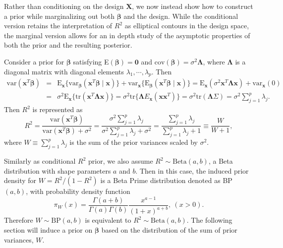 \documentclass[12pt]{article}
\newcommand{\X}{{\bm  X}}
\newcommand{\Lambdabf}{{\mathbf \Lambda}}
\begin{document}
Rather than conditioning on the design $\X$, we now instead show how to construct a prior while marginalizing out both $\bm{\beta}$ and the design. While the conditional version retains the interpretation of $R^2$ as elliptical contours in the design space, the marginal version allows for an in depth study of the asymptotic properties of   both the prior and the resulting posterior.

Consider a prior for   $ \bm{\beta}$  satisfying  E$(\bm{\beta}) = \bm 0$ and $\text{cov}(\bm{\beta}) =  \sigma^2\Lambdabf$, where $\Lambdabf$ is a diagonal matrix with diagonal elements  $ \lambda_1, \cdots, \lambda_p$.
Then
\begin{eqnarray*}
	\text{var}( \bm{x}^T\bm{\beta}) &=& \text{E}_{\bm{x}}\{ \text{var}_{\bm{\beta}}( \bm{x}^T\bm{\beta} \mid  \bm{x})\} + \text{var}_{\bm{x}}\{ \text{E}_{\bm{\beta}}( \bm{x}^T\bm{\beta}\mid \bm{x})\}
	= \text{E}_ {\bm{x}} (  \sigma^2  {\bm{x}}^T  \Lambdabf  {\bm{x}} ) + \text{var}_ {\bm{x}}( 0)\\
	&=& \sigma^2  \text{E}_ {\bm{x}}\{ \text{tr} ( {\bm{x}}^T  \Lambdabf   {\bm{x}}  )\}
	= \sigma^2 \text{tr}\{  \Lambdabf E_{\bm{x}} (     {\bm{x}}  {\bm{x}}^T ) \}
	= \sigma^2 \text{tr} (  \Lambdabf  \Sigma )
	= \sigma^2 \sum_{j=1}^p \lambda_j.
\end{eqnarray*}
Then  $R^2$ is represented as
\begin{equation} \label{eq_rsquare linear regression model}
R^2  = \frac{\text{var}({{\bm{x}}}^T\bm{\beta})}{\text{var}({ {\bm{x}}}^T\bm{\beta}) + \sigma^2}  =  \frac{\sigma^2 \sum\limits_{j=1}^p \lambda_j}{\sigma^2 \sum\limits_{j=1}^p \lambda_j  + \sigma^2}
= \frac{  \sum\limits_{j=1}^p \lambda_j}{  \sum\limits_{j=1}^p \lambda_j  + 1}  \equiv \frac{W}{W+1},
\end{equation}
where $W \equiv \sum_{j=1}^p \lambda_j $ is the sum of the prior variances scaled by $\sigma^2$.


Similarly as conditional $R^2$ prior, we   also assume  $R^2\sim \text{Beta}(a,b)$,  a Beta distribution with shape parameters $a$ and $b$. Then in this case,
the induced prior density   for  $ W =  {R^2}/(1-R^2)$  is a Beta Prime distribution \citep{johnson1995continuous} denoted as BP$(a,b)$,  with probability density function
\begin{equation*}\label{eq_varienceterm's pdf}
\pi_W(x)=  \frac{\Gamma(a+b)}{\Gamma(a)\Gamma(b)}\frac{x^{a-1}}{(1+x)^{a+b}}, \ ( x> 0). %
\end{equation*}
Therefore $W\sim \text{BP}(a,b)  $ is equivalent to  $R^2\sim\text{Beta}(a,b)$.  The following section will induce a prior on $ \bm{\beta}$ based on the distribution of  the sum of prior variances,  $W$.
\end{document}
